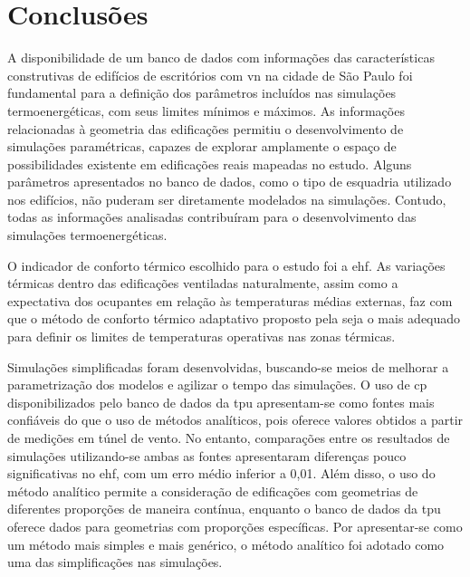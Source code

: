 \documentclass[brazil,hardcopy,openany]{ufscthesis} %
\begin{document}
\chapter{Conclusões}
\label{chapter:conclusoes}
	
	A disponibilidade de um banco de dados com informações das características construtivas de edifícios de escritórios com \acrfull{vn} na cidade de São Paulo foi fundamental para a definição dos parâmetros incluídos nas simulações termoenergéticas, com seus limites mínimos e máximos. 
	As informações relacionadas à geometria das edificações permitiu o desenvolvimento de simulações paramétricas, capazes de explorar amplamente o espaço de possibilidades existente em edificações reais mapeadas no estudo.
	Alguns parâmetros apresentados no banco de dados, como o tipo de esquadria utilizado nos edifícios, não puderam ser diretamente modelados na simulações. Contudo, todas as informações analisadas contribuíram para o desenvolvimento das simulações termoenergéticas.
	
	O indicador de conforto térmico escolhido para o estudo foi a \acrfull{ehf}. As variações térmicas dentro das edificações ventiladas naturalmente, assim como a expectativa dos ocupantes em relação às temperaturas médias externas, faz com que o método de conforto térmico adaptativo proposto pela  seja o mais adequado para definir os limites de temperaturas operativas nas zonas térmicas.
	
	Simulações simplificadas foram desenvolvidas, buscando-se meios de melhorar a parametrização dos modelos e agilizar o tempo das simulações.	
	O uso de \acrfull{cp} disponibilizados pelo banco de dados da \acrfull{tpu} apresentam-se como fontes mais confiáveis do que o uso de métodos analíticos, pois oferece valores obtidos a partir de medições em túnel de vento. No entanto, comparações entre os resultados de simulações utilizando-se ambas as fontes apresentaram diferenças pouco significativas no \acrshort{ehf}, com um erro médio inferior a 0,01.
	Além disso, o uso do método analítico permite a consideração de edificações com geometrias de diferentes proporções de maneira contínua, enquanto o banco de dados da \acrshort{tpu} oferece dados para geometrias com proporções específicas.
	Por apresentar-se como um método mais simples e mais genérico, o método analítico foi adotado como uma das simplificações nas simulações.
	
\end{document}

